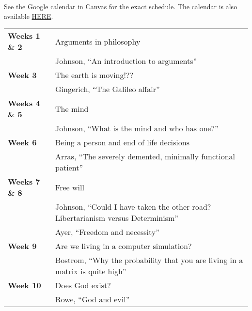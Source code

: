 \documentclass[11pt,oneside]{article}
\begin{document}
\begin{minipage}{\textwidth}
See the Google calendar in Canvas for the exact schedule. The calendar is also available \href{https://calendar.google.com/calendar/u/0?cid=YmoxZGY0djIxMmhiMjE1b3ZlMW1lbXFwdGtAZ3JvdXAuY2FsZW5kYXIuZ29vZ2xlLmNvbQ}{\url{HERE}}.

\vspace{3mm}
\begin{sffamily}
\begin{scriptsize}
\begin{tabular}{l l}
\hline
\rowcolor{blue3}
\textbf{Weeks 1 \& 2} & {Arguments in philosophy}\\
\rowcolor{blue2}&\quad Johnson, ``An introduction to arguments''\\

\rowcolor{blue3}\textbf{Week 3} & {The earth is moving!??}\\
\rowcolor{blue2}&\quad Gingerich, ``The Galileo affair''\\ 

\rowcolor{blue3}\textbf{Weeks 4 \& 5} & {The mind}\\
\rowcolor{blue2}&\quad Johnson, ``What is the mind and who has one?''\\

\rowcolor{blue3}\textbf{Week 6} & {Being a person and end of life decisions}\\
\rowcolor{blue2}&\quad Arras, ``The severely demented, minimally functional patient''\\

\rowcolor{blue3}\textbf{Weeks 7 \& 8} & {Free will}\\
\rowcolor{blue2}&\quad Johnson, ``Could I have taken the other road? Libertarianism versus Determinism''\\ 
\rowcolor{blue2}&\quad Ayer, ``Freedom and necessity''\\ 

\rowcolor{blue3}\textbf{Week 9} & {Are we living in a computer simulation?}\\
\rowcolor{blue2}&\quad Bostrom, ``Why the probability that you are living in a matrix is quite high''\\

\rowcolor{blue3}\textbf{Week 10} & {Does God exist?}\\
\rowcolor{blue2}&\quad Rowe, ``God and evil''\\


\end{tabular}
\end{scriptsize}
\end{sffamily}
\end{minipage}
\end{document}
